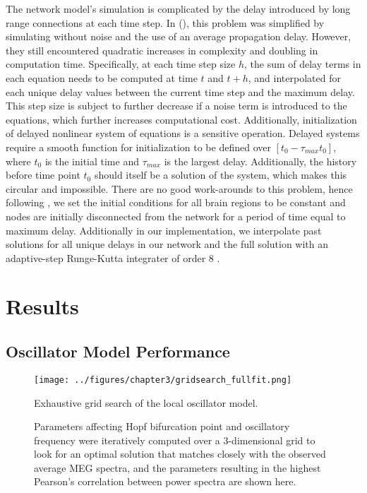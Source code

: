 The network model's simulation is complicated by the delay introduced by long range connections at each time step. In (\cite{hadida_bayesian_2018}), this problem was simplified by simulating without noise and the use of an average propagation delay. However, they still encountered quadratic increases in complexity and doubling in computation time. Specifically, at each time step size $h$, the sum of delay terms in each equation needs to be computed at time $t$ and $t+h$, and interpolated for each unique delay values between the current time step and the maximum delay. This step size is subject to further decrease if a noise term is introduced to the equations, which further increases computational cost. Additionally, initialization of delayed nonlinear system of equations is a sensitive operation. Delayed systems require a smooth function for initialization to be defined over $[t_0 - \tau_{max} t_0]$, where $t_0$ is the initial time and $\tau_{max}$ is the largest delay. Additionally, the history before time point $t_0$ should itself be a solution of the system, which makes this circular and impossible. There are no good work-arounds to this problem, hence following \cite{hadida_bayesian_2018}, we set the initial conditions for all brain regions to be constant and nodes are initially disconnected from the network for a period of time equal to maximum delay. Additionally in our implementation, we interpolate past solutions for all unique delays in our network and the full solution with an adaptive-step Runge-Kutta integrater of order 8 \cite{hairer_analysis_2008}.

\section{Results}

\subsection{Oscillator Model Performance}

\begin{figure}[htbp]
    \centering
    \texttt{[image: ../figures/chapter3/gridsearch\_fullfit.png]}
    \caption{Exhaustive grid search of the local oscillator model.}
    \caption*{Parameters affecting Hopf bifurcation point and oscillatory frequency were iteratively computed over a 3-dimensional grid to look for an optimal solution that matches closely with the observed average MEG spectra, and the parameters resulting in the highest Pearson's correlation between power spectra are shown here.}
    \label{fig:grid_search}
\end{figure}

